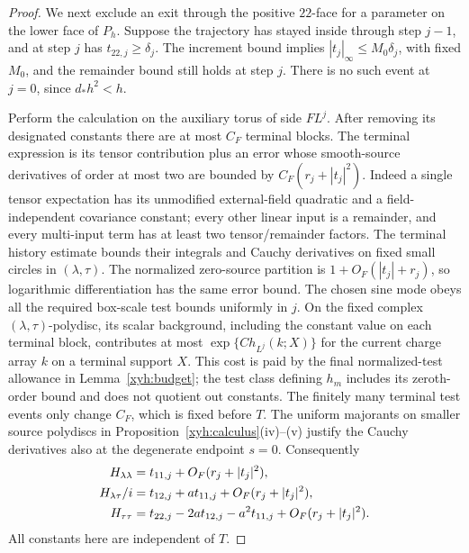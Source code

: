 \begin{proof}
We next exclude an exit through the positive \(22\)-face for a
parameter on the lower face of \(P_h\).  Suppose the trajectory
has stayed inside through step \(j-1\), and at step \(j\) has
\(t_{22,j}\ge\delta_j\).  The increment bound implies
\(|t_j|_\infty\le M_0\delta_j\), with fixed \(M_0\), and the
remainder bound still holds at step \(j\).  There is no such event
at \(j=0\), since \(d_*h^2<h\).

Perform the calculation on the auxiliary torus of side \(FL^j\).
After removing its designated constants there are at most \(C_F\)
terminal blocks.  The terminal expression is its tensor contribution
plus an error whose smooth-source derivatives of order at most two
are bounded by
\(C_F(r_j+|t_j|^2)\).  Indeed a single tensor expectation has its
unmodified external-field quadratic and a field-independent covariance
constant; every other linear input is a remainder, and every
multi-input term has at least two tensor/remainder factors.  The
terminal history estimate bounds their integrals and Cauchy
derivatives on fixed small circles in \((\lambda,\tau)\).
The normalized zero-source partition is \(1+O_F(|t_j|+r_j)\),
so logarithmic differentiation has the same error bound.  The chosen
sine mode obeys all the required box-scale test bounds uniformly in
\(j\). On the fixed complex \((\lambda,\tau)\)-polydisc, its scalar
background, including the constant value on each terminal block,
contributes at most \(\exp\{C h_{L^j}(k;X)\}\) for the current charge
array \(k\) on a terminal support \(X\). This cost is paid by the
final normalized-test allowance in Lemma~\ref{xyh:budget}; the test
class defining \(h_m\) includes its zeroth-order bound and does not
quotient out constants. The finitely many terminal test events only
change \(C_F\), which is fixed before \(T\). The uniform majorants
on smaller source polydiscs in
Proposition~\ref{xyh:calculus}(iv)--(v) justify the Cauchy derivatives
also at the degenerate endpoint \(s=0\).
Consequently
\begin{align}
 H_{\lambda\lambda}&=t_{11,j}
                  +O_F(r_j+|t_j|^2),\notag\\
 H_{\lambda\tau}/i&=t_{12,j}+a t_{11,j}
                  +O_F(r_j+|t_j|^2),\notag\\
 H_{\tau\tau}&=t_{22,j}-2a t_{12,j}-a^2t_{11,j}
                  +O_F(r_j+|t_j|^2).
 \label{xyf:terminalhessian}
\end{align}
All constants here are independent of \(T\).


\end{proof}
